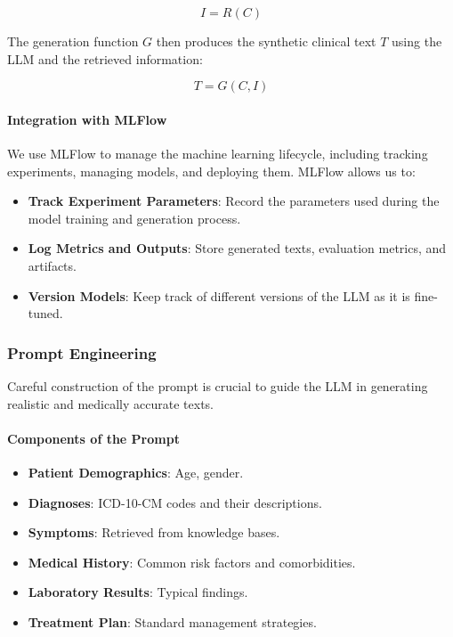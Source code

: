 \documentclass[12pt, a4paper]{article}
\begin{document}
\[
I = R(C)
\]

The generation function \( G \) then produces the synthetic clinical text \( T \) using the LLM and the retrieved information:

\[
T = G(C, I)
\]

\paragraph{Integration with MLFlow}

We use MLFlow to manage the machine learning lifecycle, including tracking experiments, managing models, and deploying them. MLFlow allows us to:

\begin{itemize}
    \item \textbf{Track Experiment Parameters}: Record the parameters used during the model training and generation process.
    \item \textbf{Log Metrics and Outputs}: Store generated texts, evaluation metrics, and artifacts.
    \item \textbf{Version Models}: Keep track of different versions of the LLM as it is fine-tuned.
\end{itemize}

\subsubsection{Prompt Engineering}

Careful construction of the prompt is crucial to guide the LLM in generating realistic and medically accurate texts.

\paragraph{Components of the Prompt}

\begin{itemize}
    \item \textbf{Patient Demographics}: Age, gender.
    \item \textbf{Diagnoses}: ICD-10-CM codes and their descriptions.
    \item \textbf{Symptoms}: Retrieved from knowledge bases.
    \item \textbf{Medical History}: Common risk factors and comorbidities.
    \item \textbf{Laboratory Results}: Typical findings.
    \item \textbf{Treatment Plan}: Standard management strategies.
\end{itemize}
\end{document}
